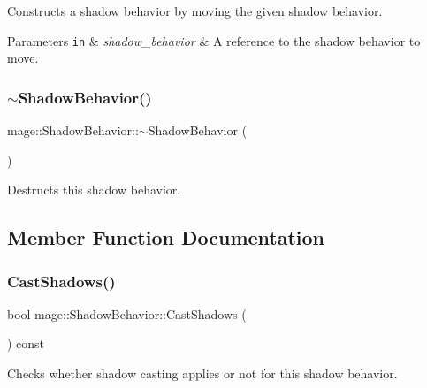 Constructs a shadow behavior by moving the given shadow behavior.


\begin{DoxyParams}[1]{Parameters}
\mbox{\tt in}  & {\em shadow\+\_\+behavior} & A reference to the shadow behavior to move. \\
\hline
\end{DoxyParams}
\hypertarget{structmage_1_1_shadow_behavior_aa19b11ddd0b322cdc423031630d6f09a}{}\label{structmage_1_1_shadow_behavior_aa19b11ddd0b322cdc423031630d6f09a} 
\subsubsection{\texorpdfstring{$\sim$\+Shadow\+Behavior()}{~ShadowBehavior()}}
{\footnotesize\ttfamily mage\+::\+Shadow\+Behavior\+::$\sim$\+Shadow\+Behavior (\begin{DoxyParamCaption}{ }\end{DoxyParamCaption})\hspace{0.3cm}{\ttfamily [default]}}

Destructs this shadow behavior. 

\subsection{Member Function Documentation}
\hypertarget{structmage_1_1_shadow_behavior_a37cfde9a881e2f233f8a30b06f5e22f6}{}\label{structmage_1_1_shadow_behavior_a37cfde9a881e2f233f8a30b06f5e22f6} 
\subsubsection{\texorpdfstring{Cast\+Shadows()}{CastShadows()}}
{\footnotesize\ttfamily bool mage\+::\+Shadow\+Behavior\+::\+Cast\+Shadows (\begin{DoxyParamCaption}{ }\end{DoxyParamCaption}) const\hspace{0.3cm}{\ttfamily [noexcept]}}

Checks whether shadow casting applies or not for this shadow behavior.

